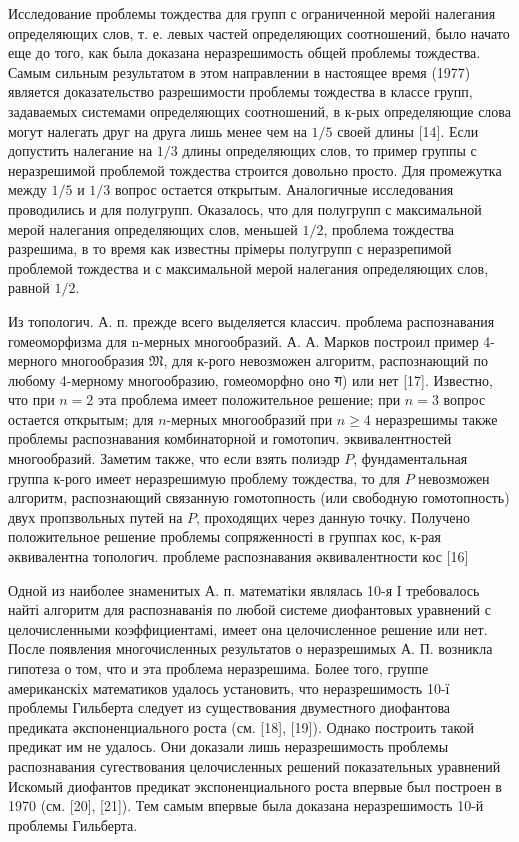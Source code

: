 \documentclass[10pt]{article}
\begin{document}
Исследование проблемы тождества для групп с ограниченной меройі налегания определяющих слов, т. е. левых частей определяющих соотношений, было начато еще до того, как была доказана неразрешимость общей проблемы тождества. Самым сильным результатом в этом направлении в настоящее время (1977) является доказательство разрешимости проблемы тождества в классе групп, задаваемых системами определяющих соотношений, в к-рых определяющие слова могут налегать друг на друга лишь менее чем на $1 / 5$ своей длины [14]. Если допустить налегание на $1 / 3$ длины определяющих слов, то пример группы с неразрешимой проблемой тождества строится довольно просто. Для промежутка между $1 / 5$ и $1 / 3$ вопрос остается открытым. Аналогичные исследования проводились и для полугрупп. Оказалось, что для полугрупп с максимальной мерой налегания определяющих слов, меньшей $1 / 2$, проблема тождества разрешима, в то время как известны прімеры полугрупп с неразрепимой проблемой тождества и с максимальной мерой налегания определяющих слов, равной $1 / 2$.



Из топологич. А. п. прежде всего выделяется классич. проблема распознавания гомеоморфизма для n-мерных многообразий. А. А. Марков построил пример 4-мерного многообразия $\mathfrak{M}$, для к-рого невозможен алгоритм, распознающий по любому 4-мерному многообразию, гомеоморфно оно ग) или нет [17]. Известно, что при $n=2$ эта проблема имеет положительное решение; при $n=3$ вопрос остается открытым; для $n$-мерных многообразий при $n \geqslant 4$ неразрешимы также проблемы распознавания комбинаторной и гомотопич. эквивалентностей многообразий. Заметим также, что если взять полиэдр $P$, фундаментальная группа к-рого имеет неразрешимую проблему тождества, то для $P$ невозможен алгоритм, распознающий связанную гомотопность (или свободную гомотопность) двух пропзвольных путей на $P$, проходящих через данную точку. Получено положительное решение проблемы сопряженності в группах кос, к-рая әквивалентна топологич. проблеме распознавания әквивалентности кос [16]



Одной из наиболее знаменитых А. п. математіки являлась 10-я І требовалось найті алгоритм для распознаванія по любой системе диофантовых уравнений с целочисленными коэффициентамі, имеет она целочисленное решение или нет. После появления многочисленных результатов о неразрешимых А. П. возникла гипотеза о том, что и эта проблема неразрешима. Более того, группе американскіх математиков удалось установить, что неразрешимость 10-ї проблемы Гильберта следует из существования двуместного диофантова предиката әкспоненциального роста (см. [18], [19]). Однако построить такой предикат им не удалось. Они доказали лишь неразрешимость проблемы распознавания сугествования целочисленных решений показательных уравнений Искомый диофантов предикат экспоненциального роста впервые был построен в 1970 (см. [20], [21]). Тем самым впервые была доказана неразрешимость 10-й проблемы Гильберта.
\end{document}
